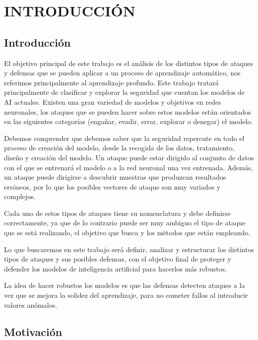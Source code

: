 \chapter{INTRODUCCIÓN}
\label{ch:1}


\section{Introducción}

El objetivo principal de este trabajo es el análisis de los distintos tipos de ataques y defensas que se pueden aplicar a un proceso de aprendizaje automático, nos referimos principalmente al aprendizaje profundo.
Este trabajo tratará principalmente de clasificar y explorar la seguridad que cuentan los modelos de \gls{AI} actuales.
Existen una gran variedad de modelos y objetivos en redes neuronales, los ataques que se pueden hacer sobre estos modelos están orientados en las siguientes categorías (engañar, evadir, errar, explorar o denegar) el modelo.

Debemos comprender que debemos saber que la seguridad repercute en todo el proceso de creación del modelo, desde la recogida de los datos, tratamiento, diseño y creación del modelo.
Un ataque puede estar dirigido al conjunto de datos con el que se entrenará el modelo o a la red neuronal una vez entrenada.
Además, un ataque puede dirigirse a descubrir muestras que produzcan resultados erróneos, por lo que los posibles vectores de ataque son muy variados y complejos.

Cada uno de estos tipos de ataques tiene su nomenclatura y debe definirse correctamente, ya que de lo contrario puede ser muy ambiguo el tipo de ataque que se está realizando, el objetivo que busca y los métodos que están empleando.

Lo que buscaremos en este trabajo será definir, analizar y estructurar los distintos tipos de ataques y sus posibles defensas, con el objetivo final de proteger y defender los modelos de inteligencia artificial para hacerlos más robustos.

La idea de hacer robustos los modelos es que las defensas detecten ataques a la vez que se mejora la solidez del aprendizaje, para no cometer fallos al introducir valores anómalos.

\section{Motivación}

